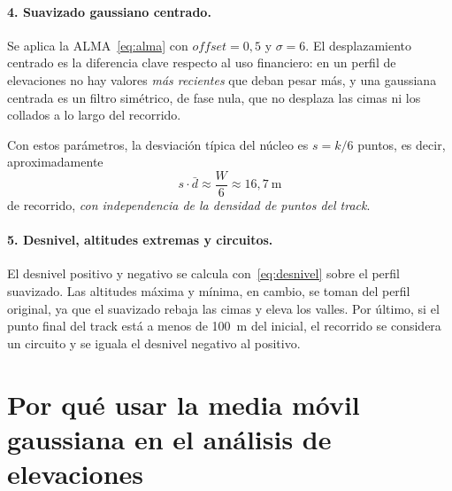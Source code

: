 \documentclass[11pt,a4paper]{article}
\begin{document}
\paragraph{4. Suavizado gaussiano centrado.}
Se aplica la ALMA~\eqref{eq:alma} con $\textit{offset} = 0{,}5$ y $\sigma = 6$.
El desplazamiento centrado es la diferencia clave respecto al uso financiero:
en un perfil de elevaciones no hay valores \emph{más recientes} que deban pesar
más, y una gaussiana centrada es un filtro simétrico, de fase nula, que no
desplaza las cimas ni los collados a lo largo del recorrido.

Con estos parámetros, la desviación típica del núcleo es $s = k/6$ puntos, es
decir, aproximadamente
\begin{equation}
    s \cdot \bar{d} \approx \frac{W}{6} \approx 16{,}7~\text{m}
\end{equation}
de recorrido, \emph{con independencia de la densidad de puntos del track}.

\paragraph{5. Desnivel, altitudes extremas y circuitos.}
El desnivel positivo y negativo se calcula con~\eqref{eq:desnivel} sobre el
perfil suavizado. Las altitudes máxima y mínima, en cambio, se toman del perfil
original, ya que el suavizado rebaja las cimas y eleva los valles. Por último,
si el punto final del track está a menos de 100~m del inicial, el recorrido se
considera un circuito y se iguala el desnivel negativo al positivo.

\section{Por qué usar la media móvil gaussiana en el análisis de elevaciones}
\end{document}
